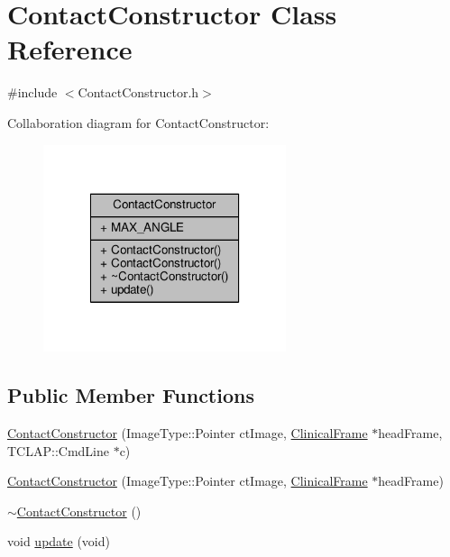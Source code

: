 \hypertarget{classContactConstructor}{\section{Contact\-Constructor Class Reference}
\label{classContactConstructor}
}


{\ttfamily \#include $<$Contact\-Constructor.\-h$>$}



Collaboration diagram for Contact\-Constructor\-:
\nopagebreak
\begin{figure}[H]
\begin{center}
\leavevmode
\includegraphics[width=202pt]{classContactConstructor__coll__graph}
\end{center}
\end{figure}
\subsection*{Public Member Functions}
\begin{DoxyCompactItemize}
\item 
\hyperlink{classContactConstructor_af9c80081fce365e37e2a7586b7d5ffb9}{Contact\-Constructor} (Image\-Type\-::\-Pointer ct\-Image, \hyperlink{classClinicalFrame}{Clinical\-Frame} $\ast$head\-Frame, T\-C\-L\-A\-P\-::\-Cmd\-Line $\ast$c)
\item 
\hyperlink{classContactConstructor_a0cfd4cbb2ac1c5e0583c6afadb9cdb2d}{Contact\-Constructor} (Image\-Type\-::\-Pointer ct\-Image, \hyperlink{classClinicalFrame}{Clinical\-Frame} $\ast$head\-Frame)
\item 
\hyperlink{classContactConstructor_a0e6112e4fa828e26fbca30bb577c828b}{$\sim$\-Contact\-Constructor} ()
\item 
void \hyperlink{classContactConstructor_a75bc343f91d250464589258271905bc6}{update} (void)
\end{DoxyCompactItemize}
